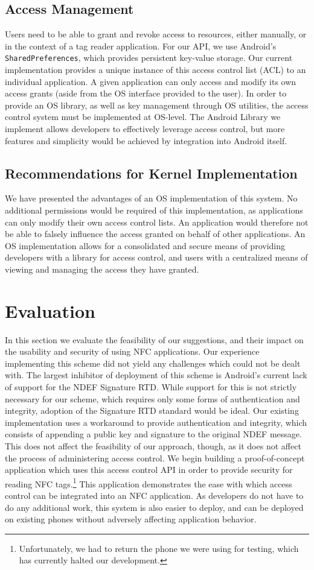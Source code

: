 \documentclass[12pt]{article}
\begin{document}
\subsection{Access Management}
Users need to be able to grant and revoke access to resources, either manually, or in the context of a tag reader application.
For our API, we use Android's \texttt{SharedPreferences}, which provides persistent key-value storage.
Our current implementation provides a unique instance of this access control list (ACL) to an individual application.
A given application can only access and modify its own access grants (aside from the OS interface provided to the user).
In order to provide an OS library, as well as key management through OS utilities, the access control system must be implemented at OS-level.
The Android Library we implement allows developers to effectively leverage access control, but more features and simplicity would be achieved by integration into Android itself.

\subsection{Recommendations for Kernel Implementation}
We have presented the advantages of an OS implementation of this system.
No additional permissions would be required of this implementation, as applications can only modify their own access control lists.
An application would therefore not be able to falsely influence the access granted on behalf of other applications.
An OS implementation allows for a consolidated and secure means of providing developers with a library for access control, and users with a centralized means of viewing and managing the access they have granted.

\section{Evaluation}
In this section we evaluate the feasibility of our suggestions, and their impact on the usability and security of using NFC applications.
Our experience implementing this scheme did not yield any challenges which could not be dealt with.
The largest inhibitor of deployment of this scheme is Android's current lack of support for the NDEF Signature RTD.
While support for this is not strictly necessary for our scheme, which requires only some forms of authentication and integrity, adoption of the Signature RTD standard would be ideal.
Our existing implementation uses a workaround to provide authentication and integrity, which consists of appending a public key and signature to the original NDEF message.
This does not affect the feasibility of our approach, though, as it does not affect the process of administering access control.
We begin building a proof-of-concept application which uses this access control API in order to provide security for reading NFC tags.\footnote{Unfortunately, we had to return the phone we were using for testing, which has currently halted our development.}
This application demonstrates the ease with which access control can be integrated into an NFC application.
As developers do not have to do any additional work, this system is also easier to deploy, and can be deployed on existing phones without adversely affecting application behavior.
\end{document}
